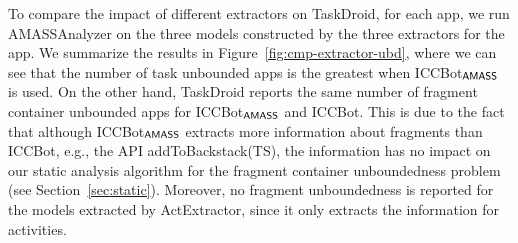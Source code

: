 To compare the impact of different extractors on TaskDroid, for each app, we run {\sf AMASSAnalyzer} on the three models constructed by the three extractors for the app. We summarize the results in Figure~\ref{fig:cmp-extractor-ubd}, where we can see that the number of task unbounded apps is the greatest when ICCBot$_{\textsf{AMASS}}$ is used. 
On the other hand, TaskDroid reports the same number of fragment container unbounded apps for ICCBot$_{\textsf{AMASS}}$ and ICCBot. This is due to the fact that although ICCBot$_{\textsf{AMASS}}$ extracts more information about fragments than ICCBot, e.g., the API addToBackstack(TS), the  information has no impact on our static analysis algorithm for the fragment container unboundedness problem (see Section~\ref{sec:static}). Moreover, no fragment unboundedness is reported for the models extracted by ActExtractor, since it only extracts the information for activities. 



